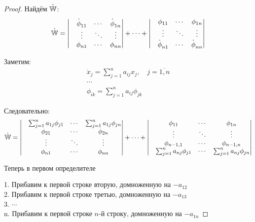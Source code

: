\begin{proof}
  Найдём $\overset{\textbf .}{\mathbb W}$:
  $$ \overset{\textbf .}{\mathbb W} =
  \begin{vmatrix}
  & \overset{\textbf .}{\phi}_{1 1} & \cdots & \overset{\textbf .}{\phi}_{1 n} \\
  & \vdots     & \ddots & \vdots     \\
  & \phi_{n 1} & \cdots & \phi_{n n} \\
  \end{vmatrix}
  + \cdots + 
  \begin{vmatrix}
  & \phi_{1 1} & \cdots & \phi_{1 n} \\
  & \vdots     & \ddots & \vdots     \\
  & \overset{\textbf .}{\phi}_{n 1} & \cdots & \overset{\textbf .}{\phi}_{n n} \\
  \end{vmatrix}
  $$

Заметим:
$$\begin{aligned}
\dot x_j = \sum_{j=1}^n a_{i j} x_j, \quad j=\overline{1,n}\\
\cdots\\
\phi_{i k} = \sum_{j=1}^n a_{i j} \phi_{j k}
\end{aligned}$$

Следовательно:
$$ \overset{\textbf .}{\mathbb W} = 
\begin{vmatrix}
& \sum_{j=1}^n a_{1 j} \phi_{j 1} & \cdots & \sum_{j=1}^n a_{1 j} \phi_{j n} \\
& \phi_{2 1} & \cdots & \phi_{2 n} \\
& \vdots     & \ddots & \vdots \\
& \phi_{n 1} & \cdots & \phi_{n n}
\end{vmatrix}
 + \cdots + 
\begin{vmatrix}
& \phi_{1 1} & \cdots & \phi_{1 n} \\
& \vdots     & \ddots & \vdots     \\
& \phi_{n-1, 1} & \cdots & \phi_{n-1, n} \\
& \sum_{j=1}^n a_{n j} \phi_{j 1} & \cdots & \sum_{j=1}^n a_{n j} \phi_{j n}
\end{vmatrix}
$$

Теперь в первом определителе

1.  Прибавим к первой строке вторую, домноженную на $-a_{1 2}$ \\
2.   Прибавим к первой строке третью, домноженную на $-a_{1 3}$ \\
3.   $\cdots$ \\
n.   Прибавим к первой строке $n$-й строку, домноженную на $-a_{1 n}$


\end{proof}
